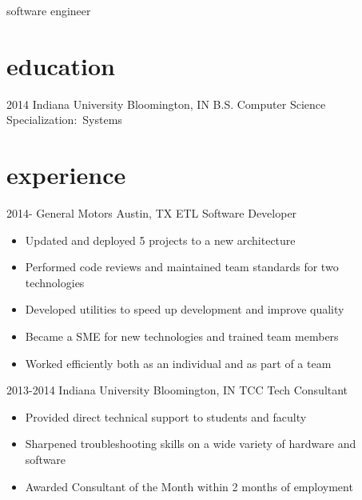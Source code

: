 \documentclass[]{friggeri-cv} %
\begin{document}
 
 
        {software engineer}





\section{education}

 \begin{entrylist}
  \entry
     {2014}
     {Indiana University}
     {Bloomington, IN}
     {B.S. Computer Science}
     {Specialization:~Systems}
    
 \end{entrylist}

 \section{experience}

 \begin{entrylist}
   \entry
     {2014-}
     {General Motors}
     {Austin, TX}
     {ETL Software Developer}
     {\begin{itemize}
         \item Updated and deployed 5 projects to a new architecture 
         \item Performed code reviews and maintained team standards for two\\ technologies
         \item Developed utilities to speed up development and improve quality
         \item Became a SME for new technologies and trained team members
         \item Worked efficiently both as an individual and as part of a team

     \end{itemize}}
   \entry
     {2013-2014}
     {Indiana University}
     {Bloomington, IN}
     {TCC Tech Consultant}
     {\begin{itemize}
        \item Provided direct technical support to students and faculty
        \item Sharpened troubleshooting skills on a wide variety of hardware and \\software
        \item Awarded Consultant of the Month within 2 months of employment
     \end{itemize}
     }
 \end{entrylist}
\end{document}
